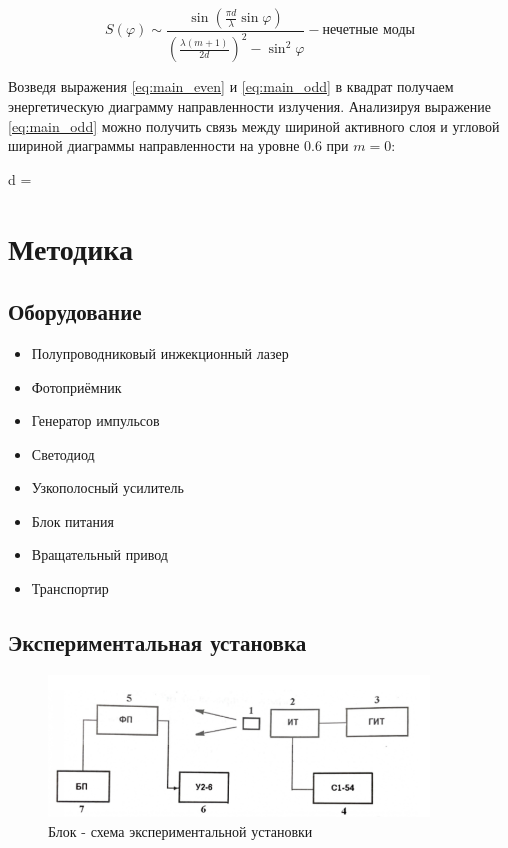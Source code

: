 \documentclass[a4paper, 12pt]{extarticle}
\begin{document}
\begin{equation}
    \label{eq:main_even}
    S(\varphi) \sim \frac{\sin \left( \frac{\pi d}{\lambda} \sin \varphi \right)}
    {\left( \frac{\lambda (m+1)}{2d} \right)^2 - \sin^2 \varphi} - \text{нечетные моды}
\end{equation}


Возведя выражения \ref{eq:main_even} и \ref{eq:main_odd} в квадрат получаем энергетическую диаграмму направленности излучения. Анализируя выражение \ref{eq:main_odd} можно получить связь между шириной активного слоя и угловой шириной диаграммы направленности на уровне 0.6 при $m = 0$:

\begin{fequation}
d = 
\end{fequation}


\section*{\textcolor{header}{Методика}}
\subsection*{\textcolor{sub_header}{Оборудование}}
\begin{itemize}
    \item Полупроводниковый инжекционный лазер
    \item Фотоприёмник
    \item Генератор импульсов
    \item Светодиод
    \item Узкополосный усилитель
    \item Блок питания
    \item Вращательный привод
    \item Транспортир
\end{itemize}

\subsection*{\textcolor{sub_header}{Экспериментальная установка}}

\begin{figure}[htbp]
    \centering
    \includegraphics[width = 0.9\textwidth]{pics/experimental_setup.png}
    \caption{Блок - схема экспериментальной установки}
    \label{fig:exp_setup}
\end{figure}
\end{document}
